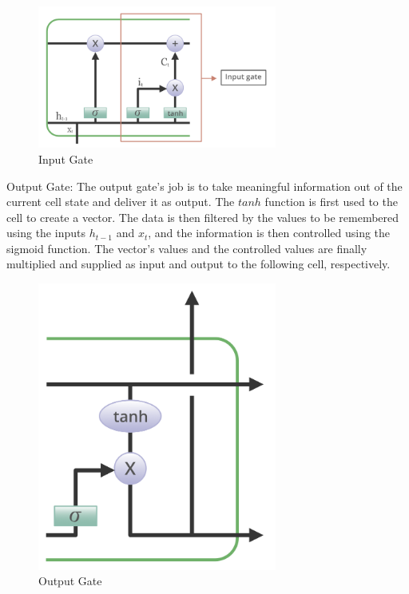 \begin{figure}[H]
    \centering
    \includegraphics[width=0.7\textwidth]{Images/lstm_input.png}
    \caption{Input Gate}
    \label{fig1}
\end{figure}

Output Gate: The output gate's job is to take meaningful information out of the current cell state and deliver it as output. The $tanh$ function is first used to the cell to create a vector. The data is then filtered by the values to be remembered using the inputs $h_{t-1}$ and $x_t$, and the information is then controlled using the sigmoid function. The vector's values and the controlled values are finally multiplied and supplied as input and output to the following cell, respectively.

\begin{figure}[H]
    \centering
    \includegraphics[width=0.7\textwidth]{Images/lstm_output.png}
    \caption{Output Gate}
    \label{fig1}
\end{figure}

